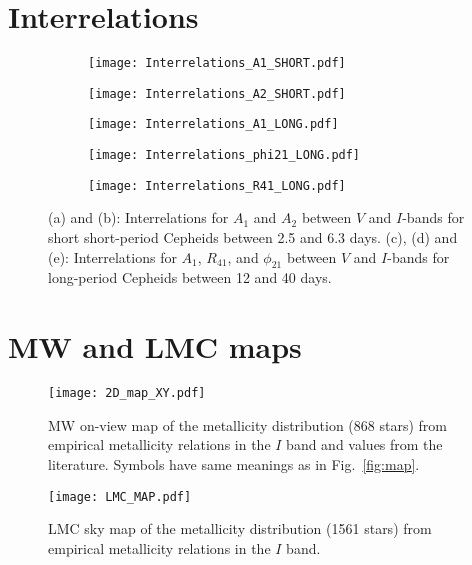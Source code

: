 \documentclass[article]{aa} %
\begin{document}
\begin{appendix}
\newpage
\section{Interrelations}
\begin{figure*}[htb!] %
\begin{subfigure}{0.50\textwidth}
\texttt{[image: Interrelations\_A1\_SHORT.pdf]}
\caption{}
\end{subfigure}\hspace*{\fill}
\begin{subfigure}{0.50\textwidth}
\texttt{[image: Interrelations\_A2\_SHORT.pdf]}
\caption{}
\end{subfigure}
\begin{subfigure}{0.50\textwidth}
\texttt{[image: Interrelations\_A1\_LONG.pdf]}
\caption{} 
\end{subfigure}\hspace*{\fill}
\begin{subfigure}{0.50\textwidth}
\texttt{[image: Interrelations\_phi21\_LONG.pdf]}
\caption{}
\end{subfigure}
\begin{subfigure}{0.50\textwidth}
\texttt{[image: Interrelations\_R41\_LONG.pdf]}
\caption{}
\end{subfigure}\hspace*{\fill}
\caption{\small (a) and (b): Interrelations for $A_1$ and $A_2$ between $V$ and $I$-bands for short short-period Cepheids between 2.5 and 6.3 days. (c), (d) and (e): Interrelations for $A_1$, $R_{41}$, and $\phi_{21}$ between $V$ and $I$-bands for long-period Cepheids between 12 and 40 days.\label{fig:inter}}
\end{figure*}


\FloatBarrier
\section{MW and LMC maps}
\begin{figure*}
\centering
\texttt{[image: 2D\_map\_XY.pdf]}
\caption{\small MW on-view map of the metallicity distribution (868 stars) from empirical metallicity relations in the $I$ band and values from the literature. Symbols have same meanings as in Fig.~\ref{fig:map}.}\label{fig:MW_map_annex}
\FloatBarrier
\end{figure*}
\begin{figure*}[htb!]
\centering
\texttt{[image: LMC\_MAP.pdf]}
\caption{\small LMC sky map of the metallicity distribution (1561 stars) from empirical metallicity relations in the $I$ band.} \label{fig:LMC_map_zoom}
\end{figure*}


\end{appendix}
\end{document}
